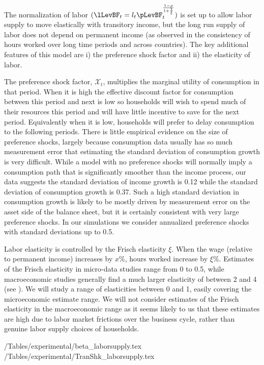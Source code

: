 The normalization of labor $(\lLevBF_t = l_t \pLevBF_t^{\frac{1-\rho}{1+\frac{1}{\xi}}})$ is set up to allow labor supply to move elastically with transitory income, but the long run supply of labor does not depend on permanent income (as observed in the consistency of hours worked over long time periods and across countries). The key additional features of this model are i) the preference shock factor and ii) the elasticity of labor.

The preference shock factor, $\mathcal{X}_t$, multiplies the marginal utility of consumption in that period. When it is high the effective discount factor for consumption between this period and next is low so households will wish to spend much of their resources this period and will have little incentive to save for the next period. Equivalently when it is low, households will prefer to delay consumption to the following periods. There is little empirical evidence on the size of preference shocks, largely because consumption data usually has so much measurement error that estimating the standard deviation of consumption growth is very difficult. While a model with no preference shocks will normally imply a consumption path that is significantly smoother than the income process, our data suggests the standard deviation of income growth is 0.12 while the standard deviation of consumption growth is 0.37. Such a high standard deviation in consumption growth is likely to be mostly driven by measurement error on the asset side of the balance sheet, but it is certainly consistent with very large preference shocks. In our simulations we consider annualized preference shocks with standard deviations up to 0.5.

Labor elasticity is controlled by the Frisch elasticity $\xi$. When the wage (relative to permanent income) increases by $x\%$, hours worked increase by $\xi\%$. Estimates of the Frisch elasticity in micro-data studies range from 0 to 0.5, while macroeconomic studies generally find a much larger elasticity of between 2 and 4 (see \cite{peterman_reconciling_2016}). We will study a range of elasticities between 0 and 1, easily covering the microeconomic estimate range. We will not consider estimates of the Frisch elasticity in the macroeconomic range as it seems likely to us that these estimates are high due to labor market frictions over the business cycle, rather than genuine labor supply choices of households.

\begin{center}
	\econtexRoot/Tables/experimental/beta_laborsupply.tex	
	\econtexRoot/Tables/experimental/TranShk_laborsupply.tex		
	\label{table:fitted_beta_and_transtd}
\end{center}

